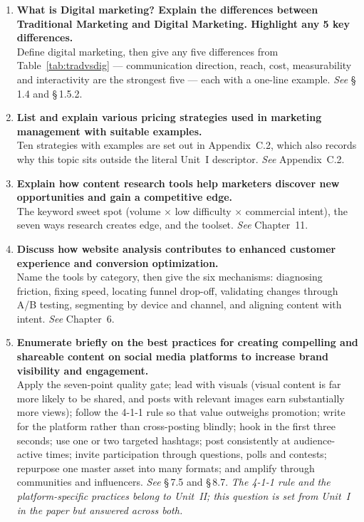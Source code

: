 \documentclass{MMTextbook}
\begin{document}
\begin{enumerate}[leftmargin=2.2em,itemsep=1.4ex]
\item \textbf{What is Digital marketing? Explain the differences between
      Traditional Marketing and Digital Marketing. Highlight any 5 key
      differences.}
      \\
      Define digital marketing, then give any five differences from
      Table~\ref{tab:tradvsdig} --- communication direction, reach, cost,
      measurability and interactivity are the strongest five --- each with a
      one-line example. \hfill\emph{See} \S\,1.4 and \S\,1.5.2.

\item \textbf{List and explain various pricing strategies used in marketing
      management with suitable examples.}
      \\
      Ten strategies with examples are set out in Appendix~C.2, which also
      records why this topic sits outside the literal Unit~I descriptor.
      \hfill\emph{See} Appendix~C.2.

\item \textbf{Explain how content research tools help marketers discover new
      opportunities and gain a competitive edge.}
      \\
      The keyword sweet spot (volume $\times$ low difficulty $\times$ commercial
      intent), the seven ways research creates edge, and the toolset.
      \hfill\emph{See} Chapter~11.

\item \textbf{Discuss how website analysis contributes to enhanced customer
      experience and conversion optimization.}
      \\
      Name the tools by category, then give the six mechanisms: diagnosing
      friction, fixing speed, locating funnel drop-off, validating changes
      through A/B testing, segmenting by device and channel, and aligning
      content with intent. \hfill\emph{See} Chapter~6.

\item \textbf{Enumerate briefly on the best practices for creating compelling and
      shareable content on social media platforms to increase brand visibility
      and engagement.}
      \\
      Apply the seven-point quality gate; lead with visuals (visual content is
      far more likely to be shared, and posts with relevant images earn
      substantially more views); follow the 4-1-1 rule so that value outweighs
      promotion; write for the platform rather than cross-posting blindly; hook
      in the first three seconds; use one or two targeted hashtags; post
      consistently at audience-active times; invite participation through
      questions, polls and contests; repurpose one master asset into many
      formats; and amplify through communities and influencers.
      \hfill\emph{See} \S\,7.5 and \S\,8.7. \emph{The 4-1-1 rule and the
      platform-specific practices belong to Unit~II; this question is
      set from Unit~I in the paper but answered across both.}


\end{enumerate}
\end{document}
